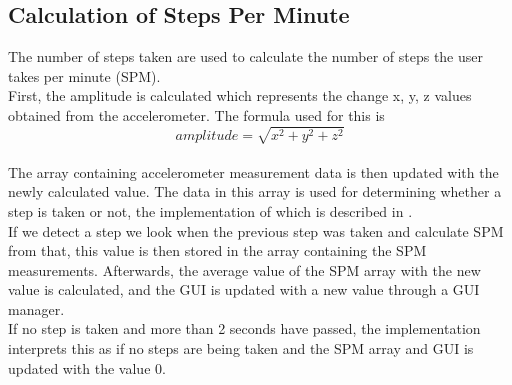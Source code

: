 \subsection{Calculation of Steps Per Minute}
The number of steps taken are used to calculate the number of steps the user takes per minute (SPM).\\

First, the amplitude is calculated which represents the change x, y, z values obtained from the accelerometer. The formula used for this is $$amplitude = \sqrt{x^{2} + y^{2} + z^{2}}$$\\

The array containing accelerometer measurement data is then updated with the newly calculated value. The data in this array is used for determining whether a step is taken or not, the implementation of which is described in .\\

If we detect a step we look when the previous step was taken and calculate SPM from that, this value is then stored in the array containing the SPM measurements. Afterwards, the average value of the SPM array with the new value is calculated, and the GUI is updated with a new value through a GUI manager.\\

If no step is taken and more than 2 seconds have passed, the implementation interprets this as if no steps are being taken and the SPM array and GUI is updated with the value 0.